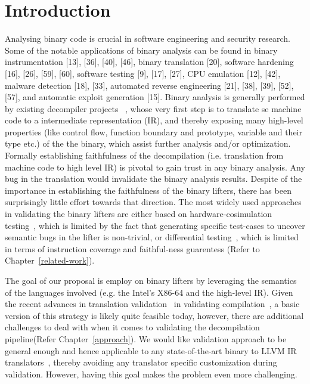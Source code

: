 \chapter{Introduction}\label{sec:ba}

Analysing binary code is crucial in software engineering and security research.
Some of the notable applications of binary analysis can be found in binary
instrumentation [13], [36], [40], [46], binary translation [20], software
hardening [16], [26], [59], [60], software testing [9], [17], [27], CPU
emulation [12], [42], malware detection [18], [33], automated reverse
engineering [21], [38], [39], [52], [57], and automatic exploit generation
[15]. Binary analysis is generally performed by existing decompiler projects
~\cite{McSema:Recon14,Remill,Angr1,BAP:CAV11,Radare2}, whose very first step is
to translate se machine code to a intermediate representation (IR), and thereby
exposing many high-level properties (like control flow, function boundary and
    prototype, variable and their type etc.) of the the binary, which  assist
further analysis and/or optimization. Formally establishing faithfulness of the
decompilation (i.e. translation from machine code to high level IR) is pivotal
to gain trust in any binary analysis. Any bug in the translation would
invalidate the binary analysis results. Despite of the importance in
establishing the faithfulness of the binary lifters, there has been
surprisingly little effort towards that direction. The most widely used
approaches in validating the binary lifters are either based on
hardware-cosimulation testing~\cite{Martignoni:ISSTA2009,Martignoni:ISSTA2010},
  which is limited by the fact that generating specific test-cases to uncover
  semantic bugs in the lifter is non-trivial, or differential
  testing~\cite{Martignoni:ASPLOS2012,ASE2017}, which is limited in terms of
  instruction coverage and faithful-ness guarentess (Refer to
      Chapter~\ref{related-work}).

The goal of our proposal is employ \TV on binary lifters by leveraging
the semantics of the languages involved (e.g. the Intel's X86-64 and the
    high-level IR).  Given the recent advances in translation
validation~\cite{} in validating compilation~\cite{}, a basic version of this
strategy is likely quite feasible today, however, there are additional
challenges to deal with when it comes to validating the decompilation
pipeline(Refer Chapter~\ref{approach}). We would like validation approach to be
general enough and hence applicable to any state-of-the-art binary to LLVM IR
translators~\cite{McSema:Recon14,Remill,FCD,reopt,llvm-mctoll}, thereby
avoiding any translator specific customization during validation.  However,
         having this goal makes the problem even more challenging.

